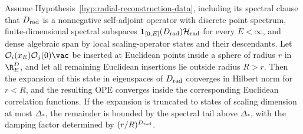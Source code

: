 \begin{theorem}
\label{thm:euclidean-radial-ope-convergence}
  Assume Hypothesis~\ref{hyp:radial-reconstruction-data}, including its
  spectral clause that \(D_{\rm rad}\) is a nonnegative self-adjoint operator
  with discrete point spectrum, finite-dimensional spectral subspaces
  \(\mathbf 1_{[0,E]}(D_{\rm rad})\mathcal H_{\rm rad}\) for every
  \(E<\infty\), and dense algebraic span by local scaling-operator states and
  their descendants.  Let
  \(\mathcal O_i(x_E)\mathcal O_j(0)\vac\) be inserted at Euclidean points
  inside a sphere of radius \(r\) in \(\R^D_E\), and let all remaining
  Euclidean insertions lie outside radius \(R>r\).  Then the expansion of this
  state in eigenspaces of \(D_{\rm rad}\) converges in Hilbert norm for
  \(r<R\), and the resulting OPE converges inside the corresponding Euclidean
  correlation functions.  If the expansion is truncated to states of scaling
  dimension at most \(\Delta_*\), the remainder is bounded by the spectral
  tail above \(\Delta_*\), with the damping factor determined by
  \((r/R)^{D_{\rm rad}}\).
\end{theorem}

